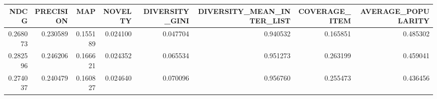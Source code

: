\begin{tabular}{rrrrrrrr}
\toprule
    NDCG &  PRECISION &      MAP &  NOVELTY &  DIVERSITY\_GINI &  DIVERSITY\_MEAN\_INTER\_LIST &  COVERAGE\_ITEM &  AVERAGE\_POPULARITY \\
\midrule
0.268073 &   0.230589 & 0.155189 & 0.024100 &        0.047704 &                   0.940532 &       0.165851 &            0.485302 \\
0.282596 &   0.246206 & 0.166621 & 0.024352 &        0.065534 &                   0.951273 &       0.263199 &            0.459041 \\
0.274037 &   0.240479 & 0.160827 & 0.024640 &        0.070096 &                   0.956760 &       0.255473 &            0.436456 \\
\bottomrule
\end{tabular}
